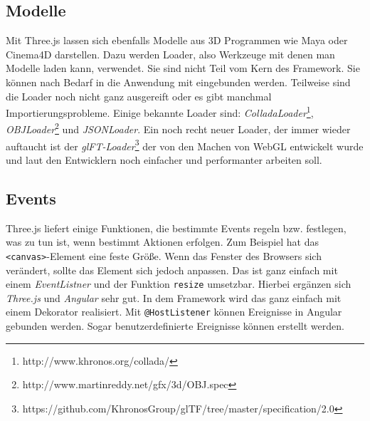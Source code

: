 \subsection{Modelle}
\label{subsec:objekte}
%
Mit Three.js lassen sich ebenfalls Modelle aus 3D Programmen wie Maya oder Cinema4D darstellen. Dazu werden Loader, also Werkzeuge mit denen man Modelle laden kann, verwendet. Sie sind nicht Teil vom Kern des Framework. Sie können nach Bedarf in die Anwendung mit eingebunden werden. Teilweise sind die Loader noch nicht ganz ausgereift oder es gibt manchmal Importierungsprobleme. Einige bekannte Loader sind: \textit{ColladaLoader}\footnote{http://www.khronos.org/collada/}, \textit{OBJLoader}\footnote{http://www.martinreddy.net/gfx/3d/OBJ.spec} und \textit{JSONLoader}. Ein noch recht neuer Loader, der immer wieder auftaucht ist der \textit{glFT-Loader}\footnote{https://github.com/KhronosGroup/glTF/tree/master/specification/2.0} der von den Machen von WebGL entwickelt wurde und laut den Entwicklern noch einfacher und performanter arbeiten soll.
%
\subsection{Events}
\label{subsec:events}
%
Three.js liefert einige Funktionen, die bestimmte Events regeln bzw. festlegen, was zu tun ist, wenn bestimmt Aktionen erfolgen. Zum Beispiel hat das \texttt{<canvas>}-Element eine feste Größe. Wenn das Fenster des Browsers sich verändert, sollte das Element sich jedoch anpassen. Das ist ganz einfach mit einem \textit{EventListner} und der Funktion \texttt{resize} umsetzbar.
Hierbei ergänzen sich \textit{Three.js} und \textit{Angular} sehr gut. In dem Framework wird das ganz einfach mit einem Dekorator realisiert. Mit \texttt{@HostListener} können Ereignisse in Angular gebunden werden. Sogar benutzerdefinierte Ereignisse können erstellt werden.
%
%
%
%
%

